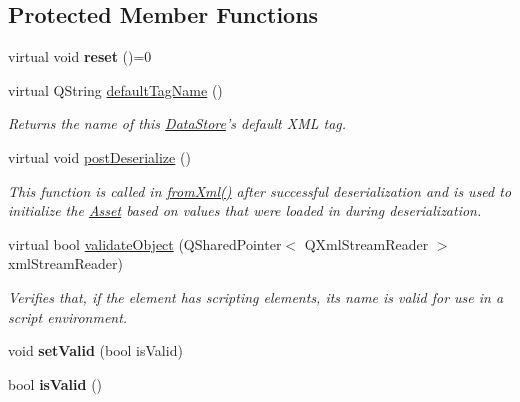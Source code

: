 \subsection*{Protected Member Functions}
\begin{DoxyCompactItemize}
\item 
\hypertarget{class_picto_1_1_analysis_tool_aceb3658a939b0671d0778e686392dd1f}{virtual void {\bfseries reset} ()=0}\label{class_picto_1_1_analysis_tool_aceb3658a939b0671d0778e686392dd1f}

\item 
virtual Q\-String \hyperlink{class_picto_1_1_analysis_tool_ab704f579af1c6aed342c29c839a9ca86}{default\-Tag\-Name} ()
\begin{DoxyCompactList}\small\item\em Returns the name of this \hyperlink{class_picto_1_1_data_store}{Data\-Store}'s default X\-M\-L tag. \end{DoxyCompactList}\item 
virtual void \hyperlink{class_picto_1_1_analysis_tool_a4e222c101573aca1ef0e271fab078eaa}{post\-Deserialize} ()
\begin{DoxyCompactList}\small\item\em This function is called in \hyperlink{class_picto_1_1_asset_a8bed4da09ecb1c07ce0dab313a9aba67}{from\-Xml()} after successful deserialization and is used to initialize the \hyperlink{class_picto_1_1_asset}{Asset} based on values that were loaded in during deserialization. \end{DoxyCompactList}\item 
\hypertarget{class_picto_1_1_analysis_tool_a4a54799d41c1e07137cbea3d25d6a6bf}{virtual bool \hyperlink{class_picto_1_1_analysis_tool_a4a54799d41c1e07137cbea3d25d6a6bf}{validate\-Object} (Q\-Shared\-Pointer$<$ Q\-Xml\-Stream\-Reader $>$ xml\-Stream\-Reader)}\label{class_picto_1_1_analysis_tool_a4a54799d41c1e07137cbea3d25d6a6bf}

\begin{DoxyCompactList}\small\item\em Verifies that, if the element has scripting elements, its name is valid for use in a script environment. \end{DoxyCompactList}\item 
\hypertarget{class_picto_1_1_analysis_tool_a06fd8a626b0fac20b0cb1de416c532d8}{void {\bfseries set\-Valid} (bool is\-Valid)}\label{class_picto_1_1_analysis_tool_a06fd8a626b0fac20b0cb1de416c532d8}

\item 
\hypertarget{class_picto_1_1_analysis_tool_ac5094996b60860c2bf6a20fc83e93813}{bool {\bfseries is\-Valid} ()}\label{class_picto_1_1_analysis_tool_ac5094996b60860c2bf6a20fc83e93813}

\end{DoxyCompactItemize}
